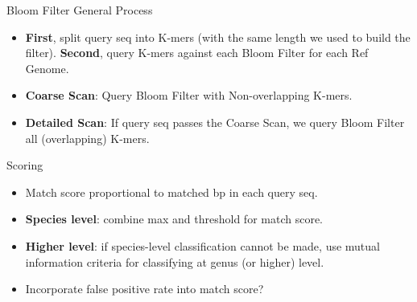 \documentclass[xcolor=x11names,compress]{beamer}
\renewcommand{\(}{\begin{columns}}
\renewcommand{\)}{\end{columns}}
\newcommand{\<}[1]{\begin{column}{#1}}
\renewcommand{\>}{\end{column}}
\begin{document}
\begin{frame}{Bloom Filter}
General Process
\begin{itemize}
\item {\bf First}, split query seq into K-mers (with the same length we used to build the filter). {\bf Second}, query K-mers against each Bloom Filter for each Ref Genome.
\item {\bf Coarse Scan}: Query Bloom Filter with Non-overlapping K-mers. 
\item {\bf Detailed Scan}: If query seq passes the Coarse Scan, we query Bloom Filter all (overlapping) K-mers.
\end{itemize}
Scoring
\begin{itemize}
	\item Match score proportional to matched bp in each query seq.
	\item {\bf Species level}: combine max and threshold for match score.
	\item {\bf Higher level}: if species-level classification cannot be made, use mutual information criteria for classifying at genus (or higher) level.
	\item Incorporate false positive rate into match score?
\end{itemize}


\end{frame}
\end{document}
